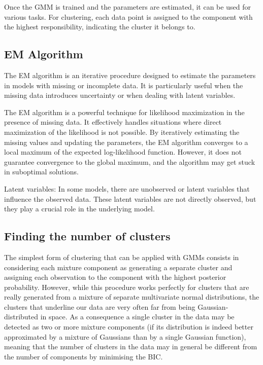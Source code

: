 \documentclass{report}
\begin{document}
Once the GMM is trained and the parameters are estimated, it can be used for various tasks. For clustering, each data point is assigned to the component with the highest responsibility, indicating the cluster it belongs to. 

\subsection{EM Algorithm}

The EM algorithm is an iterative procedure designed to estimate the parameters in models with missing or incomplete data. It is particularly useful when the missing data introduces uncertainty or when dealing with latent variables.

The EM algorithm is a powerful technique for likelihood maximization in the presence of missing data. It effectively handles situations where direct maximization of the likelihood is not possible. By iteratively estimating the missing values and updating the parameters, the EM algorithm converges to a local maximum of the expected log-likelihood function. However, it does not guarantee convergence to the global maximum, and the algorithm may get stuck in suboptimal solutions.

Latent variables:
In some models, there are unobserved or latent variables that influence the observed data. These latent variables are not directly observed, but they play a crucial role in the underlying model. 

\subsection{Finding the number of clusters}

The simplest form of clustering that can be applied with GMMs consists in considering each mixture component as generating a separate cluster and assigning each observation to the component with the highest posterior probability. However, while this procedure works perfectly for clusters that are really generated from a mixture of separate multivariate normal distributions, the clusters that underline our data are very often far from being Gaussian-distributed in space. As a consequence a single cluster in the data may be detected as two or more mixture components (if its distribution is indeed better approximated by a mixture of Gaussians than by a single Gaussian function), meaning that the number of clusters in the data may in general be different from the number of components by minimising the BIC.
\end{document}
